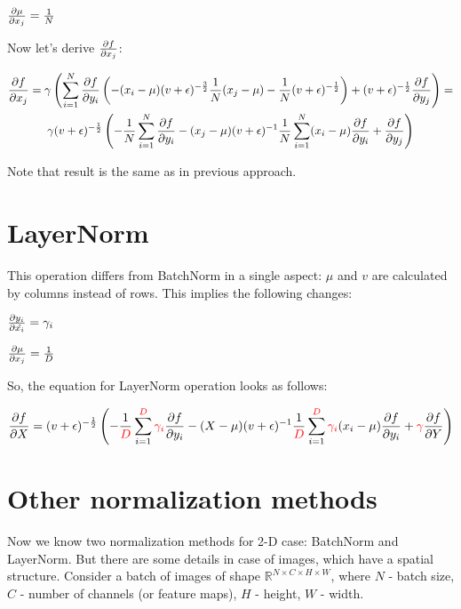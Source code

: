\documentclass[12pt]{article}
\begin{document}
$\pdv{\mu}{x_j} = \frac{1}{N}$

Now let's derive $\pdv{f}{x_j}$:

\begin{gather*}
\pdv{f}{x_j} = 
	\gamma 
	\left(
		\sum_{i=1}^{N} \pdv{f}{y_i} 
			\left( 
				- (x_i - \mu) (v + \epsilon)^{-\frac{3}{2}} \frac{1}{N} (x_j - \mu) - \frac{1}{N} (v + \epsilon)^{-\frac{1}{2}}
			\right) 
			+ (v + \epsilon)^{-\frac{1}{2}} \pdv{f}{y_j}
	\right) = \\
	\gamma (v + \epsilon)^{-\frac{1}{2}} 
	\left(	
		- \frac{1}{N} \sum_{i=1}^{N} \pdv{f}{y_i}
		- (x_j - \mu) (v + \epsilon)^{-1} \frac{1}{N} \sum_{i=1}^{N} (x_i - \mu) \pdv{f}{y_i} 
		+ \pdv{f}{y_j}
	\right)
\end{gather*}

Note that result is the same as in previous approach.

\section{LayerNorm}

This operation differs from BatchNorm in a single aspect: $\mu$ and $v$ are calculated by columns instead of rows. This implies the following changes:

$\pdv{y_i}{\hat{x_i}} = \gamma_i$

$\pdv{\mu}{x_j} = \frac{1}{D}$


So, the equation for LayerNorm operation looks as follows:

\[	
	\pdv{f}{X} = 
	(v + \epsilon)^{-\frac{1}{2}} 
	\left(	
		- \frac{1}{\begingroup\color{red} D \endgroup} 
		\sum_{i=1}^{\begingroup\color{red} D \endgroup} 
		\begingroup\color{red} \gamma_i \endgroup
		\pdv{f}{y_i}
		- (X - \mu) (v + \epsilon)^{-1} 
		\frac{1}{\begingroup\color{red} D \endgroup} 
		\sum_{i=1}^{\begingroup\color{red} D \endgroup} 
		\begingroup\color{red} \gamma_i \endgroup
		(x_i - \mu) \pdv{f}{y_i} 
		+ \begingroup\color{red} \gamma \endgroup \pdv{f}{Y}
	\right)
\]

\section{Other normalization methods}

Now we know two normalization methods for 2-D case: BatchNorm and LayerNorm. But there are some details in case of images, which have a spatial structure. Consider a batch of images of shape $\mathbb{R}^{N \times C \times H \times W}$, where $N$ - batch size, $C$ - number of channels (or feature maps), $H$ - height, $W$ - width.
\end{document}
